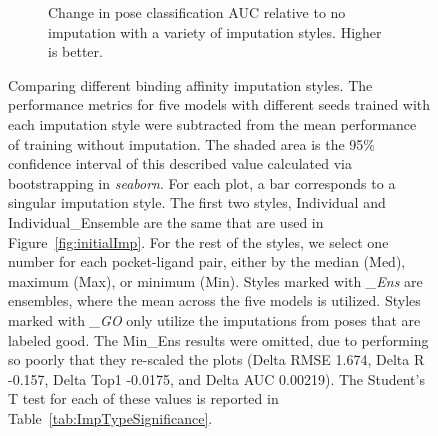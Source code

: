 \documentclass[journal=jcim,manuscript=article]{achemso}
\begin{document}
\begin{figure}[tbph]
\begin{subfigure}[t]{0.48\textwidth}
        \caption{Change in pose classification AUC relative to no imputation with a variety of imputation styles. Higher is better.}
    \end{subfigure}
    \caption{Comparing different binding affinity imputation styles. The performance metrics for five models with different seeds trained with each imputation style were subtracted from the mean performance of training without imputation. The shaded area is the 95\% confidence interval of this described value calculated via bootstrapping in \textit{seaborn}. For each plot, a bar corresponds to a singular imputation style. The first two styles, Individual and Individual\_Ensemble are the same that are used in Figure~\ref{fig:initialImp}. For the rest of the styles, we select one number for each pocket-ligand pair, either by the median (Med), maximum (Max), or minimum (Min). Styles marked with \textit{\_Ens} are ensembles, where the mean across the five models is utilized. Styles marked with \textit{\_GO} only utilize the imputations from poses that are labeled good. The Min\_Ens results were omitted, due to performing so poorly that they re-scaled the plots (Delta RMSE 1.674, Delta R -0.157, Delta Top1 -0.0175, and Delta AUC 0.00219). The Student's T test for each of these values is reported in Table~\ref{tab:ImpTypeSignificance}.}
    \label{fig:compareImp}
\end{figure}
\end{document}
